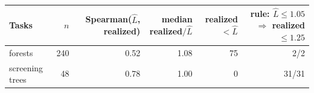 \begin{center}\small\begin{tabular}{lrrrrr}\toprule
Tasks & $n$ & Spearman($\widehat L$, realized) & median realized$/\widehat L$ & realized$<\widehat L$ & rule: $\widehat L\le1.05$ $\Rightarrow$ realized $\le1.25$ \\
\midrule
forests & 240 & 0.52 & 1.08 & 75 & 2/2 \\
screening trees & 48 & 0.78 & 1.00 & 0 & 31/31 \\
\bottomrule\end{tabular}\end{center}
